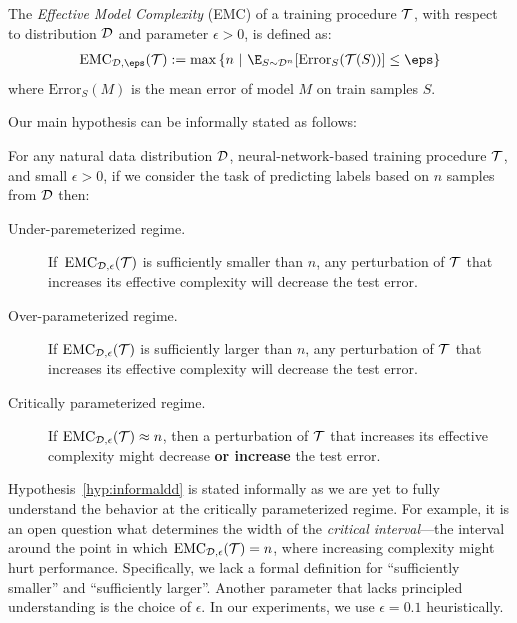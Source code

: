 \newcommand{\EMC}{\mathrm{EMC}}
\begin{definition}
The \emph{Effective Model Complexity} (EMC) of a training procedure $\mathcal{T}$, with respect to distribution $\mathcal{D}$ and parameter $\epsilon>0$,
is defined as:
\begin{align*}
    \EMC_{\cD,\eps}(\cT)
    :=  \max \left\{n ~|~ \E_{S \sim \cD^n}[ \mathrm{Error}_S( \cT( S )  ) ] \leq \eps \right\}
    \end{align*}
    where $\mathrm{Error}_S(M)$ is the mean error of model $M$ on train samples $S$.
\end{definition}

Our main hypothesis can be informally stated as follows:

\begin{hypothesis} \label{hyp:informaldd}
For any natural data distribution $\mathcal{D}$, neural-network-based training procedure $\mathcal{T}$, and small $\epsilon>0$,
if we consider the task of predicting labels based on  $n$ samples from $\mathcal{D}$ then:
\begin{description}
    \item[Under-paremeterized regime.]  If~$\EMC_{\cD,\epsilon}(\cT)$ is sufficiently smaller than $n$, any perturbation of $\mathcal{T}$ that increases its effective complexity will decrease the test error.
    \item[Over-parameterized regime.] If $\EMC_{\cD,\epsilon}(\cT)$ is sufficiently larger than $n$,
    any perturbation of $\mathcal{T}$ that increases its effective complexity will decrease the test error.
    
    \item[Critically parameterized regime.] If $\EMC_{\cD,\epsilon}(\cT) \approx n$, then
    a perturbation of $\mathcal{T}$ that increases its effective complexity
    might decrease {\bf or increase} the test error.
\end{description}
\end{hypothesis}

\iffalse
Hypothesis~\ref{hyp:informaldd} is stated informally
as we are yet to fully understand the behavior at the critically parameterized regime.
For example, it is an open question what determines the width of the \emph{critical interval}---the interval around the point  in which $\EMC_{\cD,\epsilon}(\cT) = n$, where increasing complexity might hurt performance. Specifically, we lack a formal definition for ``sufficiently smaller'' and ``sufficiently larger''. Another parameter that lacks principled understanding is the choice of $\epsilon$. In our experiments, we use $\epsilon=0.1$ heuristically.

